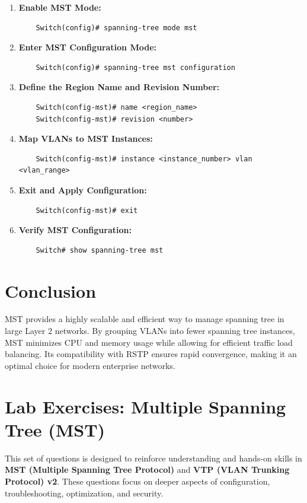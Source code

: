 \documentclass[a4paper]{book}
\begin{document}
\begin{enumerate}
	\item \textbf{Enable MST Mode:}
	      \begin{lstlisting}
    Switch(config)# spanning-tree mode mst
    \end{lstlisting}

	\item \textbf{Enter MST Configuration Mode:}
	      \begin{lstlisting}
    Switch(config)# spanning-tree mst configuration
    \end{lstlisting}

	\item \textbf{Define the Region Name and Revision Number:}
	      \begin{lstlisting}
    Switch(config-mst)# name <region_name>
    Switch(config-mst)# revision <number>
    \end{lstlisting}

	\item \textbf{Map VLANs to MST Instances:}
	      \begin{lstlisting}
    Switch(config-mst)# instance <instance_number> vlan <vlan_range>
    \end{lstlisting}

	\item \textbf{Exit and Apply Configuration:}
	      \begin{lstlisting}
    Switch(config-mst)# exit
    \end{lstlisting}

	\item \textbf{Verify MST Configuration:}
	      \begin{lstlisting}
    Switch# show spanning-tree mst
    \end{lstlisting}
\end{enumerate}

\section*{Conclusion}
MST provides a highly scalable and efficient way to manage spanning tree in large Layer 2 networks. By grouping VLANs into fewer spanning tree instances, MST minimizes CPU and memory usage while allowing for efficient traffic load balancing. Its compatibility with RSTP ensures rapid convergence, making it an optimal choice for modern enterprise networks.

\newpage

\section*{Lab Exercises: Multiple Spanning Tree (MST)}
This set of questions is designed to reinforce understanding and hands-on skills in \textbf{MST (Multiple Spanning Tree Protocol)} and \textbf{VTP (VLAN Trunking Protocol) v2}. These questions focus on deeper aspects of configuration, troubleshooting, optimization, and security.
\end{document}
